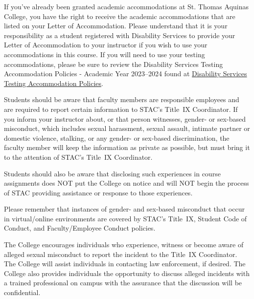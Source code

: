 \documentclass[11pt,letterpaper]{article}
\begin{document}
If you've already been granted academic accommodations at St. Thomas Aquinas College, you have the right to receive the academic accommodations that are listed on your Letter of Accommodation. Please understand that it is your responsibility as a student registered with Disability Services to provide your Letter of Accommodation to your instructor if you wish to use your accommodations in this course. If you will need to use your testing accommodations, please be sure to review the Disability Services Testing Accommodation Policies - Academic Year 2023--2024 found at \href{https://docs.google.com/document/d/1V5iUtgypiS8kClqhSLPde7AOSZPoLu6CsIDcpiEic2w/edit?usp=sharing}{Disability Services Testing Accommodation Policies}. \sectionbreak




Students should be aware that faculty members are responsible employees and are required to report certain information to STAC’s Title~IX Coordinator. If you inform your instructor about, or that person witnesses, gender- or sex-based misconduct, which includes sexual harassment, sexual assault, intimate partner or domestic violence, stalking, or any gender- or sex-based discrimination, the faculty member will keep the information as private as possible, but must bring it to the attention of STAC's Title~IX Coordinator. \pspace

Students should also be aware that disclosing such experiences in course assignments does NOT put the College on notice and will NOT begin the process of STAC providing assistance or response to those experiences. \pspace

Please remember that instances of gender- and sex-based misconduct that occur in virtual/online environments are covered by STAC’s Title~IX, Student Code of Conduct, and Faculty/Employee Conduct policies. \pspace

The College encourages individuals who experience, witness or become aware of alleged sexual misconduct to report the incident to the Title~IX Coordinator. The College will assist individuals in contacting law enforcement, if desired. The College also provides individuals the opportunity to discuss alleged incidents with a trained professional on campus with the assurance that the discussion will be confidential. \pspace
\end{document}
